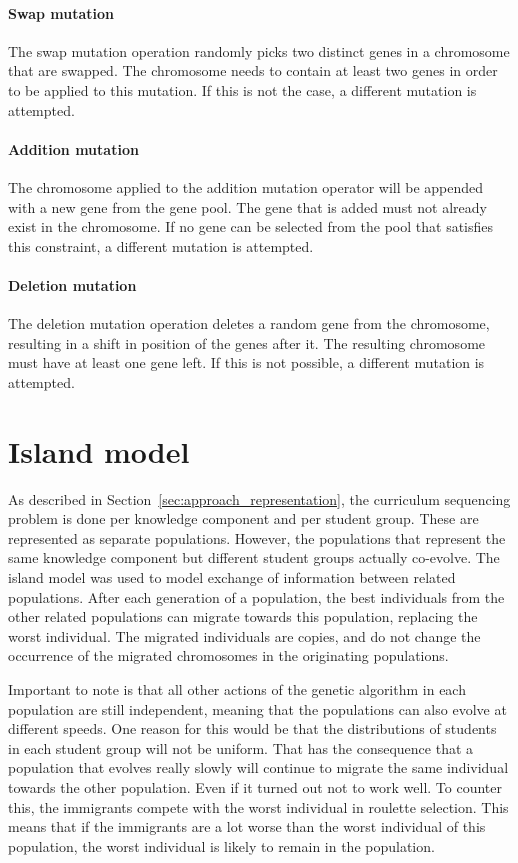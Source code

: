 \paragraph{Swap mutation} The swap mutation operation randomly picks two
distinct genes in a chromosome that are swapped. The chromosome needs to
contain at least two genes in order to be applied to this mutation. If this is
not the case, a different mutation is attempted.

\paragraph{Addition mutation} The chromosome applied to the addition mutation
operator will be appended with a new gene from the gene pool. The gene that is
added must not already exist in the chromosome. If no gene can be selected from
the pool that satisfies this constraint, a different mutation is attempted.

\paragraph{Deletion mutation} The deletion mutation operation deletes a random
gene from the chromosome, resulting in a shift in position of the genes after
it. The resulting chromosome must have at least one gene left. If this is not
possible, a different mutation is attempted.

\section{Island model}
\label{sec:approach_island_model}
As described in Section~\ref{sec:approach_representation}, the curriculum
sequencing problem is done per knowledge component and per student group. These
are represented as separate populations. However, the populations that
represent the same knowledge component but different student groups actually
co-evolve. The island model was used to model exchange of information between
related populations. After each generation of a population, the best
individuals from the other related populations can migrate towards this
population, replacing the worst individual. The migrated individuals are
copies, and do not change the occurrence of the migrated chromosomes in the
originating populations.

Important to note is that all other actions of the genetic algorithm in each
population are still independent, meaning that the populations can also evolve
at different speeds. One reason for this would be that the distributions of
students in each student group will not be uniform. That has the consequence
that a population that evolves really slowly will continue to migrate the same
individual towards the other population. Even if it turned out not to work
well. To counter this, the immigrants compete with the worst individual in
roulette selection. This means that if the immigrants are a lot worse than the
worst individual of this population, the worst individual is likely to remain
in the population.

